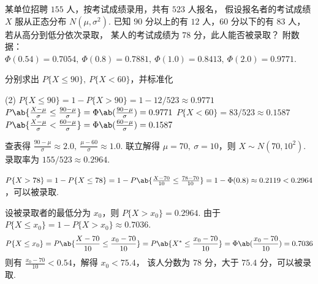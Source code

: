 \begin{problem}[本题18分]
  某单位招聘 $155$ 人，按考试成绩录用，共有 $523$ 人报名，
  假设报名者的考试成绩 $X$ 服从正态分布 $N(\mu,\sigma^2)$.
  已知 $90$ 分以上的有 $12$ 人，$60$ 分以下的有 $83$ 人，若从高分到低分依次录取，
  某人的考试成绩为 $78$ 分，此人能否被录取？
  附数据：
  $ \Phi(0.54) = 0.7054,~ \Phi(0.8) = 0.7881,~
    \Phi(1.0) = 0.8413,~ \Phi(2.0) = 0.9771 $.
\end{problem}
\scratch[10ex]
\begin{solution}
  分别求出 $P\{X \leq 90\},~ P\{ X < 60 \}$，并标准化
  \begin{tasks}[ label = \ensuremath\bullet ](2)
    \task $P\{X \leq 90\} = 1 - P\{X > 90\} = 1 - 12/523 \approx 0.9771$
    \task
    $ P\ab\{\frac{X - \mu}{\sigma} \leq \frac{90 - \mu}{\sigma}\}
    = \Phi\ab(\frac{90 - \mu}{\sigma}) = 0.9771$
    \task $P\{X < 60\} = 83/523 \approx 0.1587$
    \task
    $ P\ab\{\frac{X - \mu}{\sigma} < \frac{60 - \mu}{\sigma}\}
    = \Phi\ab(\frac{60 - \mu}{\sigma}) = 0.1587$
  \end{tasks}
  查表得
  $\frac{90 - \mu}{\sigma} \approx 2.0,~ \frac{\mu - 60}{\sigma} \approx 1.0$.
  联立解得 $\mu = 70,~ \sigma = 10$，则 $X \sim N(70,10^2)$.
  录取率为 $155/523 \approx 0.2964$.
  \begin{description}[ labelwidth = 1em, leftmargin = 0pt ]
    \item[解法1.]
    $ P\{X > 78\} = 1 - P \{X \leq 78\}
    = 1 - P\ab\{\frac{X - 70}{10} \leq \frac{78 - 70}{10}\}
    = 1 - \Phi(0.8) \approx 0.2119 < 0.2964$，可以被录取.
    \item[解法2.] 设被录取者的最低分为 $x_0$，则 $P\{X > x_0\} = 0.2964$. 由于
    $P\{X \leq x_0\} = 1 - P\{X > x_0\} \approx 0.7036$.
    \[
        P\{X \leq x_0\} = P\ab\{\frac{X - 70}{10} \leq \frac{x_0 - 70}{10}\}
      = P\ab\{X^* \leq \frac{x_0 - 70}{10}\} = \Phi\ab(\frac{x_0 - 70}{10})
      = 0.7036
    \]
    则有 $\frac{x_0 - 70}{10} < 0.54$，解得 $x_0 < 75.4$，
    该人分数为 $78$ 分，大于 $75.4$ 分，可以被录取.
  \end{description}
\end{solution}